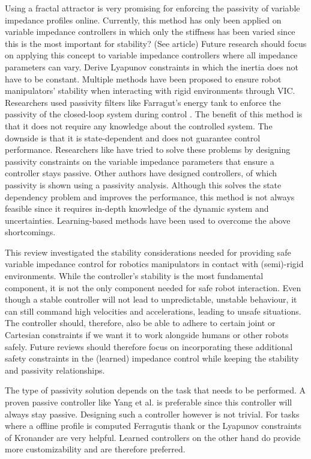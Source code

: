 Using a fractal attractor is very promising for enforcing the passivity of variable impedance profiles online. Currently, this method has only been applied on variable impedance controllers in which only the stiffness has been varied since this is the most important for stability? (See article) Future research should focus on applying this concept to variable impedance controllers where all impedance parameters can vary.
Derive Lyapunov constraints in which the inertia does not have to be constant.
Multiple methods have been proposed to ensure robot manipulators' stability when interacting with rigid environments through VIC. Researchers used passivity filters like Farragut's energy tank to enforce the passivity of the closed-loop system during control \cite{ferragutiTankbasedApproachImpedance2013}. The benefit of this method is that it does not require any knowledge about the controlled system. The downside is that it is state-dependent and does not guarantee control performance. Researchers like \cite{kronanderStabilityConsiderationsVariable2016}have tried to solve these problems by designing passivity constraints on the variable impedance parameters that ensure a controller stays passive. Other authors have designed controllers, of which passivity is shown using a passivity analysis. Although this solves the state dependency problem and improves the performance, this method is not always feasible since it requires in-depth knowledge of the dynamic system and uncertainties. Learning-based methods have been used to overcome the above shortcomings.

This review investigated the stability considerations needed for providing safe variable impedance control for robotics manipulators in contact with (semi)-rigid environments. While the controller's stability is the most fundamental component, it is not the only component needed for safe robot interaction. Even though a stable controller will not lead to unpredictable, unstable behaviour, it can still command high velocities and accelerations, leading to unsafe situations. The controller should, therefore, also be able to adhere to certain joint or Cartesian constraints if we want it to work alongside humans or other robots safely. Future reviews should therefore focus on incorporating these additional safety constraints in the (learned) impedance control while keeping the stability and passivity relationships.


The type of passivity solution depends on the task that needs to be performed. A proven passive controller like \cite{yangHumanlikeAdaptationForce2011} Yang et al. is preferable since this controller will always stay passive. Designing such a controller however is not trivial. For tasks where a offline profile is computed \cite{ferragutiTankbasedApproachImpedance2013} Ferragutis thank or the Lyapunov constraints of \cite{kronanderStabilityConsiderationsVariable2016} Kronander are very helpful. Learned controllers on the other hand do provide more customizability and are therefore preferred.


